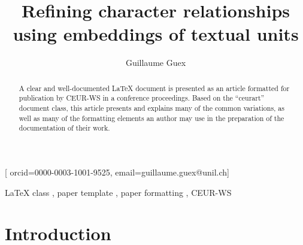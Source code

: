 \documentclass[
twocolumn,
]{ceurart}
\begin{document}


\title{Refining character relationships using embeddings of textual units}

\author[1]{Guillaume Guex}[%
orcid=0000-0003-1001-9525,
email=guillaume.guex@unil.ch]
\address[1]{Departement of Language and Information Sciences, University of Lausanne, Switzerland}

\begin{abstract}
  A clear and well-documented \LaTeX{} document is presented as an
  article formatted for publication by CEUR-WS in a conference
  proceedings. Based on the ``ceurart'' document class, this article
  presents and explains many of the common variations, as well as many
  of the formatting elements an author may use in the preparation of
  the documentation of their work.
\end{abstract}

\begin{keywords}
  LaTeX class \sep
  paper template \sep
  paper formatting \sep
  CEUR-WS
\end{keywords}

\maketitle

\section{Introduction}
\end{document}
